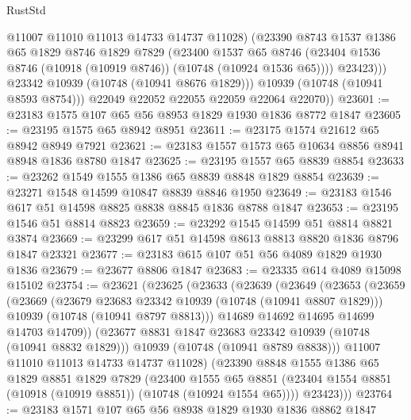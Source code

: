 \begin{lexlean}{RustStd}
\begin{coremodule}
{\begin{coremodule}
{{{{{                  @11007
                  @11010
                  @11013
                  @14733
                  @14737
                  @11028)
                (@23390
                  @8743
                  @1537
                  @1386
                  @65
                  @1829
                  @8746
                  @1829
                  @7829
                  (@23400
                    @1537
                    @65
                    @8746
                    (@23404 @1536 @8746 (@10918 (@10919 @8746)) (@10748 (@10924 @1536 @65))))
                  @23423)))
            @23342
            @10939
            (@10748 (@10941 @8676 @1829)))
          @10939
          (@10748 (@10941 @8593 @8754)))
        @22049
        @22052
        @22055
        @22059
        @22064
        @22070))
@23601 := @23183 @1575 @107 @65 @56 @8953 @1829 @1930 @1836 @8772 @1847
@23605 := @23195 @1575 @65 @8942 @8951
@23611 := @23175 @1574 @21612 @65 @8942 @8949 @7921
@23621 := @23183 @1557 @1573 @65 @10634 @8856 @8941 @8948 @1836 @8780 @1847
@23625 := @23195 @1557 @65 @8839 @8854
@23633 := @23262 @1549 @1555 @1386 @65 @8839 @8848 @1829 @8854
@23639 := @23271 @1548 @14599 @10847 @8839 @8846 @1950
@23649 := @23183 @1546 @617 @51 @14598 @8825 @8838 @8845 @1836 @8788 @1847
@23653 := @23195 @1546 @51 @8814 @8823
@23659 := @23292 @1545 @14599 @51 @8814 @8821 @3874
@23669 := @23299 @617 @51 @14598 @8613 @8813 @8820 @1836 @8796 @1847 @23321
@23677 := @23183 @615 @107 @51 @56 @4089 @1829 @1930 @1836
@23679 := @23677 @8806 @1847
@23683 := @23335 @614 @4089 @15098 @15102
@23754 := @23621
    (@23625
      (@23633
        (@23639
          (@23649
            (@23653
              (@23659
                (@23669
                  (@23679 @23683 @23342 @10939 (@10748 (@10941 @8807 @1829)))
                  @10939
                  (@10748 (@10941 @8797 @8813)))
                @14689
                @14692
                @14695
                @14699
                @14703
                @14709))
            (@23677 @8831 @1847 @23683 @23342 @10939 (@10748 (@10941 @8832 @1829)))
            @10939
            (@10748 (@10941 @8789 @8838)))
          @11007
          @11010
          @11013
          @14733
          @14737
          @11028)
        (@23390
          @8848
          @1555
          @1386
          @65
          @1829
          @8851
          @1829
          @7829
          (@23400
            @1555
            @65
            @8851
            (@23404 @1554 @8851 (@10918 (@10919 @8851)) (@10748 (@10924 @1554 @65))))
          @23423)))
@23764 := @23183 @1571 @107 @65 @56 @8938 @1829 @1930 @1836 @8862 @1847
}}}}}
\end{coremodule}}
\end{coremodule}
\end{lexlean}
